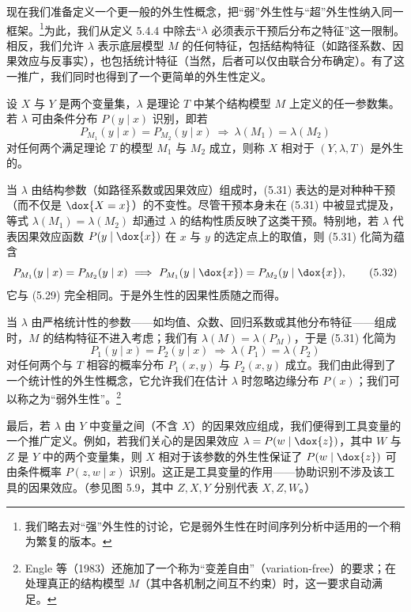 现在我们准备定义一个更一般的外生性概念，把“弱”外生性与“超”外生性纳入同一框架。\footnote{我们略去对“强”外生性的讨论，它是弱外生性在时间序列分析中适用的一个稍为繁复的版本。}为此，我们从定义 5.4.4 中除去“$\lambda$ 必须表示干预后分布之特征”这一限制。相反，我们允许 $\lambda$ 表示底层模型 $M$ 的任何特征，包括结构特征（如路径系数、因果效应与反事实），也包括统计特征（当然，后者可以仅由联合分布确定）。有了这一推广，我们同时也得到了一个更简单的外生性定义。

\begin{definition}[一般外生性]
设 $X$ 与 $Y$ 是两个变量集，$\lambda$ 是理论 $T$ 中某个结构模型 $M$ 上定义的任一参数集。若 $\lambda$ 可由条件分布 $P(y\mid x)$ 识别，即若
\begin{equation}
P_{M_1}(y\mid x)=P_{M_2}(y\mid x)\ \Longrightarrow\ \lambda(M_1)=\lambda(M_2) \tag{5.31}
\end{equation}
对任何两个满足理论 $T$ 的模型 $M_1$ 与 $M_2$ 成立，则称 $X$ 相对于 $(Y,\lambda,T)$ 是外生的。
\end{definition}

当 $\lambda$ 由结构参数（如路径系数或因果效应）组成时，\textup{(5.31)} 表达的是对种种干预（而不仅是 $\dox{X=x}$）的不变性。尽管干预本身未在 \textup{(5.31)} 中被显式提及，等式 $\lambda(M_1)=\lambda(M_2)$ 却通过 $\lambda$ 的结构性质反映了这类干预。特别地，若 $\lambda$ 代表因果效应函数 $P(y\mid \dox{x})$ 在 $x$ 与 $y$ 的选定点上的取值，则 \textup{(5.31)} 化简为蕴含
\begin{equation}
P_{M_1}(y\mid x)=P_{M_2}(y\mid x)\ \Longrightarrow\ P_{M_1}(y\mid \dox{x})=P_{M_2}(y\mid \dox{x}), \tag{5.32}
\end{equation}
它与 \textup{(5.29)} 完全相同。于是外生性的因果性质随之而得。

当 $\lambda$ 由严格统计性的参数——如均值、众数、回归系数或其他分布特征——组成时，$M$ 的结构特征不进入考虑；我们有 $\lambda(M)=\lambda(P_M)$，于是 \textup{(5.31)} 化简为
\begin{equation}
P_1(y\mid x)=P_2(y\mid x)\ \Longrightarrow\ \lambda(P_1)=\lambda(P_2) \tag{5.33}
\end{equation}
对任何两个与 $T$ 相容的概率分布 $P_1(x,y)$ 与 $P_2(x,y)$ 成立。我们由此得到了一个统计性的外生性概念，它允许我们在估计 $\lambda$ 时忽略边缘分布 $P(x)$；我们可以称之为“弱外生性”。\footnote{Engle 等（1983）还施加了一个称为“变差自由”（variation-free）的要求；在处理真正的结构模型 $M$（其中各机制之间互不约束）时，这一要求自动满足。}

最后，若 $\lambda$ 由 $Y$ 中变量之间（不含 $X$）的因果效应组成，我们便得到工具变量的一个推广定义。例如，若我们关心的是因果效应 $\lambda=P(w\mid \dox{z})$，其中 $W$ 与 $Z$ 是 $Y$ 中的两个变量集，则 $X$ 相对于该参数的外生性保证了 $P(w\mid \dox{z})$ 可由条件概率 $P(z,w\mid x)$ 识别。这正是工具变量的作用——协助识别不涉及该工具的因果效应。（参见图 5.9，其中 $Z,X,Y$ 分别代表 $X,Z,W$。）

